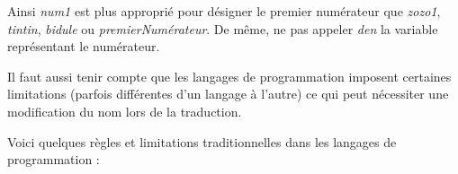 \documentclass[11pt,a4paper]{article}
\begin{document}
          Ainsi \textit{num1} est plus appropri\'e pour d\'esigner le premier num\'erateur 
          que \textit{zozo1}, \textit{tintin}, \textit{bidule}
          ou \textit{premierNum\'erateur}. 
          De m\^eme, ne pas appeler \textit{den} la variable repr\'esentant le num\'erateur.
        
            \par
        
          Il faut aussi tenir compte que les langages de programmation imposent certaines limitations
          (parfois diff\'erentes d'un langage \`a l'autre) ce qui peut n\'ecessiter une modification du nom
          lors de la traduction.
        
            \par
        
          Voici quelques r\`egles et limitations traditionnelles dans les langages de programmation :
          
\end{document}
